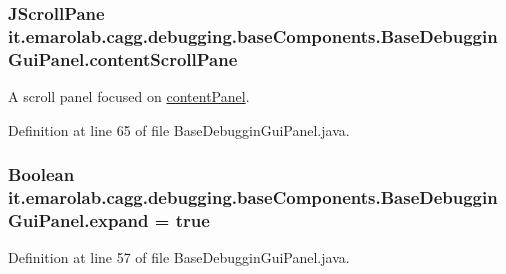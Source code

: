 \hypertarget{classit_1_1emarolab_1_1cagg_1_1debugging_1_1baseComponents_1_1BaseDebugginGuiPanel_add5f4b188d367b9c26806753977e6029}{
\subsubsection[{content\-Scroll\-Pane}]{\setlength{\rightskip}{0pt plus 5cm}J\-Scroll\-Pane it.\-emarolab.\-cagg.\-debugging.\-base\-Components.\-Base\-Debuggin\-Gui\-Panel.\-content\-Scroll\-Pane\hspace{0.3cm}{\ttfamily [protected]}}}\label{classit_1_1emarolab_1_1cagg_1_1debugging_1_1baseComponents_1_1BaseDebugginGuiPanel_add5f4b188d367b9c26806753977e6029}
A scroll panel focused on \hyperlink{classit_1_1emarolab_1_1cagg_1_1debugging_1_1baseComponents_1_1BaseDebugginGuiPanel_a20dd485862372d4f536e47f201386c32}{content\-Panel}. 

Definition at line 65 of file Base\-Debuggin\-Gui\-Panel.\-java.

\hypertarget{classit_1_1emarolab_1_1cagg_1_1debugging_1_1baseComponents_1_1BaseDebugginGuiPanel_a73c0cec164dbf05a9ec5ae33baa99b57}{
\subsubsection[{expand}]{\setlength{\rightskip}{0pt plus 5cm}Boolean it.\-emarolab.\-cagg.\-debugging.\-base\-Components.\-Base\-Debuggin\-Gui\-Panel.\-expand = true\hspace{0.3cm}{\ttfamily [private]}}}\label{classit_1_1emarolab_1_1cagg_1_1debugging_1_1baseComponents_1_1BaseDebugginGuiPanel_a73c0cec164dbf05a9ec5ae33baa99b57}


Definition at line 57 of file Base\-Debuggin\-Gui\-Panel.\-java.

